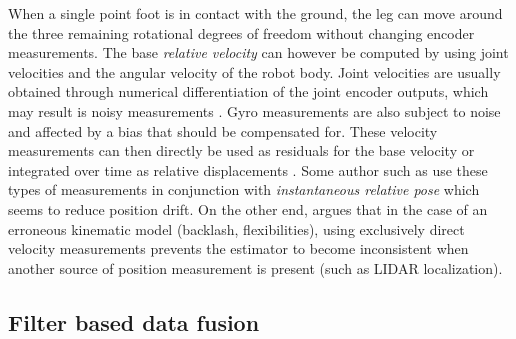 When a single point foot is in contact with the ground, the leg can move around the three remaining rotational degrees of freedom without changing encoder measurements.
The base \textit{relative velocity} can however be computed by using joint velocities and the angular velocity of the robot body. 
Joint velocities are usually obtained through numerical differentiation of the joint encoder outputs, which may result is noisy measurements \cite{rotella2016imu}.
Gyro measurements are also subject to noise and affected by a bias that should be compensated for. These velocity measurements can then directly be used as
residuals for the base velocity \cite{bloesch2013stateSlippery,bledt2018cheetah} or integrated over time as relative 
displacements \cite{ma2012robust, wisth2020preintegrated}. Some author such as \cite{bloesch2013stateSlippery, bledt2018cheetah} 
use these types of measurements in conjunction with \textit{instantaneous relative pose} which seems to reduce position drift. On the other end,
\cite{fallon2014drift} argues that in the case of an erroneous kinematic model (backlash, flexibilities), using exclusively direct velocity measurements
prevents the estimator to become inconsistent when another source of position measurement is present (such as LIDAR localization).  



\subsection{Filter based data fusion}


